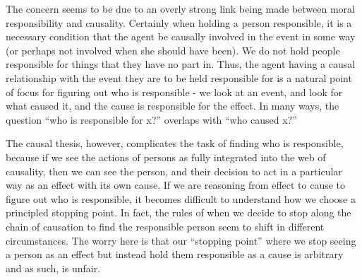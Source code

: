 \documentclass[phd,12pt,oneside,paper=letterpaper]{ubcthesis}
\begin{document}
The concern seems to be due to an overly strong link being made between moral responsibility and causality. Certainly when holding a person responsible, it is a necessary condition that the agent be causally involved in the event in some way (or perhaps not involved when she should have been). We do not hold people responsible for things that they have no part in. Thus, the agent having a causal relationship with the event they are to be held responsible for is a natural point of focus for figuring out who is responsible - we look at an event, and look for what caused it, and the cause is responsible for the effect. In many ways, the question ``who is responsible for x?'' overlaps with ``who caused x?''

The causal thesis, however, complicates the task of finding who is responsible, because if we see the actions of persons as fully integrated into the web of causality, then we can see the person, and their decision to act in a particular way as an effect with its own cause. If we are reasoning from effect to cause to figure out who is responsible, it becomes difficult to understand how we choose a principled stopping point. In fact, the rules of when we decide to stop along the chain of causation to find the responsible person seem to shift in different circumstances. The worry here is that our ``stopping point''  where we stop seeing a person as an effect but instead hold them responsible as a cause is arbitrary and as such, is unfair. 
\end{document}
